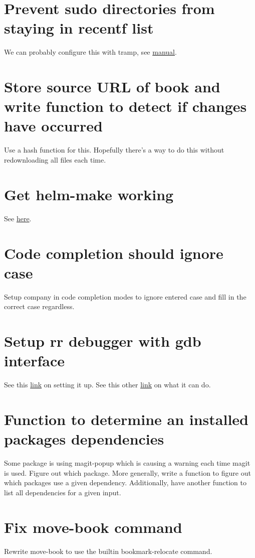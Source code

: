 \documentclass{default}
\begin{document}
\section{Prevent sudo directories from staying in recentf list}

We can probably configure this with tramp, see \href{https://www.gnu.org/software/tramp/tramp-emacs.html}{manual}.

\section{Store source URL of book and write function to detect if changes have occurred}

Use a hash function for this. Hopefully there's a way to do this without redownloading all files
each time.

\section{Get helm-make working}

See \href{https://github.com/abo-abo/helm-make}{here}.

\section{Code completion should ignore case}

Setup company in code completion modes to ignore entered case and fill in the correct case
regardless.

\section{Setup rr debugger with gdb interface}

See this
\href{https://emacs.stackexchange.com/questions/20056/is-it-possible-to-use-mozillas-rr-with-gdb-multi-window?rq=1}{link}
on setting it up. See this other
\href{http://fitzgeraldnick.com/2015/11/02/back-to-the-futurre.html}{link} on what it can do.

\section{Function to determine an installed packages dependencies}

Some package is using magit-popup which is causing a warning each time magit is used. Figure out
which package. More generally, write a function to figure out which packages use a given
dependency. Additionally, have another function to list all dependencies for a given input.

\section{Fix move-book command}

Rewrite move-book to use the builtin bookmark-relocate command.
\end{document}
